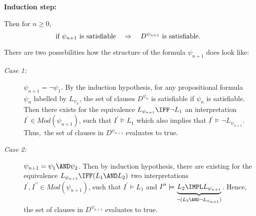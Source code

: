 {	\newpage
	
	\textbf{Induction step:}
	
	\medskip
	
	Then for $n\geq 0$,%
	\begin{equation*}
	\text{if }\psi _{n+1}\text{ is satisfiable\quad }\Rightarrow \text{\quad }%
	D^{\psi _{n+1}}\text{ is satisfiable.}
	\end{equation*}
	
	There are two possebilities how the structure of the formula $\psi _{n+1}$
	does look like:
	
	\begin{description}
	\item[\textsl{Case 1:}] $\psi _{n+1}=\lnot \psi _{1}$. By the induction
	hypothesis, for any propositional formula $\psi _{n}$ labelled by $L_{\psi
	_{n}}$, the set of clauses $D^{\psi _{n}}$ is satisfiable if $\psi _{n}$ is
	satisfiable. Then there exists for the equivalence $L_{\psi _{n+1}}\IFF\lnot
	L_{1}$ an interpretation $I^{\prime }\in Mod(\psi _{n+1})$, such that $%
	I^{\prime }\models L_{1}$ which also implies that $I^{\prime }\models \lnot
	L_{\psi _{n+1}}$. Thus,\ the set of clauses in $D^{\psi _{n+1}}$ evaluates
	to true.
	
	\item[\textsl{Case 2:}] $\psi _{n+1}=\psi _{1}\AND\psi _{2}$. Then by
	induction hypothesis, there are existing for the equivalence $L_{\psi _{n+1}}%
	\IFF(L_{1}\AND L_{2})$ two interpretations $I^{\prime },I^{\prime \prime
	}\in Mod(\psi _{n+1})$, such that $I^{\prime }\models L_{1}$ and $I^{\prime
	\prime }\models \underbrace{L_{2}\IMPL L_{\psi _{n+1}}}_{\lnot (L_{2}\AND\lnot%
	{L}_{\psi _{n+1}})}$. Hence, the set of clauses in $D^{\psi _{n+1}}$
	evaluates to true.
	\end{description}
	
	\bigskip
}
